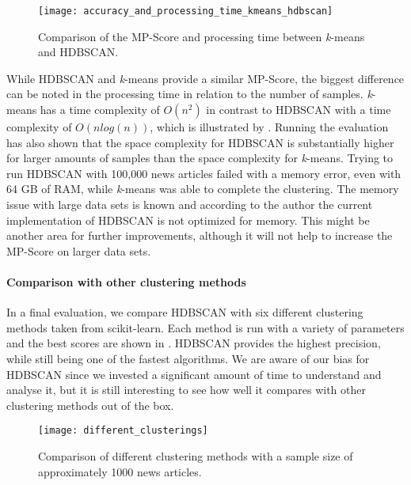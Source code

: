 \begin{figure}[h]
    \centering
    \texttt{[image: accuracy\_and\_processing\_time\_kmeans\_hdbscan]}
    \caption{Comparison of the MP-Score and processing time between \textit{k}-means and HDBSCAN.}
    \label{fig:precision_and_processing_time_kmeans_hdbscan}
\end{figure}

While HDBSCAN and \textit{k}-means provide a similar MP-Score,
the biggest difference can be noted in the processing time in relation to the number of samples.
\textit{k}-means has a time complexity of $O(n^2)$ in contrast to HDBSCAN with a time complexity of $O(nlog(n))$,
which is illustrated by .
Running the evaluation has also shown that the space complexity for HDBSCAN
is substantially higher for larger amounts of samples than the space complexity for \textit{k}-means.
Trying to run HDBSCAN with 100,000 news articles failed with a memory error,
even with 64 GB of RAM, while \textit{k}-means was able to complete the clustering.
The memory issue with large data sets is known and according to the author the current implementation of HDBSCAN
is not optimized for memory\cite{hdbscan_memory_issue}.
This might be another area for further improvements,
although it will not help to increase the MP-Score on larger data sets.

\paragraph{Comparison with other clustering methods}
In a final evaluation, we compare HDBSCAN with six different clustering methods taken from scikit-learn.
Each method is run with a variety of parameters and the best scores are shown in .
HDBSCAN provides the highest precision, while still being one of the fastest algorithms.
We are aware of our bias for HDBSCAN since we invested a significant amount of time to understand and analyse it,
but it is still interesting to see how well it compares with other clustering methods out of the box.

\begin{figure}[h]
    \centering
    \texttt{[image: different\_clusterings]}
    \caption{Comparison of different clustering methods with a sample size of approximately 1000 news articles.}
    \label{fig:different_clusterings}
\end{figure}

